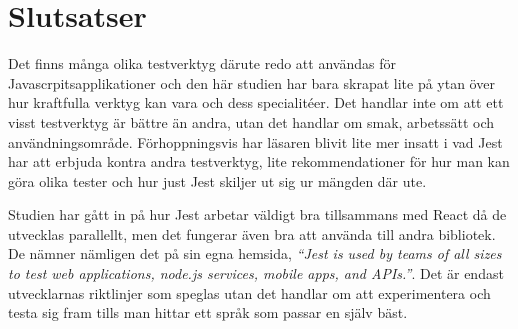 \section{Slutsatser}
\label{sec:david-conclusion}
Det finns många olika testverktyg därute redo att användas för Javascrpitsapplikationer och den här studien har bara skrapat lite på ytan över hur kraftfulla verktyg kan vara och dess specialitéer. Det handlar inte om att ett visst testverktyg är bättre än andra, utan det handlar om smak, arbetssätt och användningsområde. Förhoppningsvis har läsaren blivit lite mer insatt i vad Jest har att erbjuda kontra andra testverktyg, lite rekommendationer för hur man kan göra olika tester och hur just Jest skiljer ut sig ur mängden där ute. 

Studien har gått in på hur Jest arbetar väldigt bra tillsammans med React då de utvecklas parallellt, men det fungerar även bra att använda till andra bibliotek. De nämner nämligen det på sin egna hemsida, \textit{``Jest is used by teams of all sizes to test web applications, node.js services, mobile apps, and APIs.''}\cite{bib-jest}.  Det är endast utvecklarnas riktlinjer som speglas utan det handlar om att experimentera och testa sig fram tills man hittar ett språk som passar en själv bäst. 